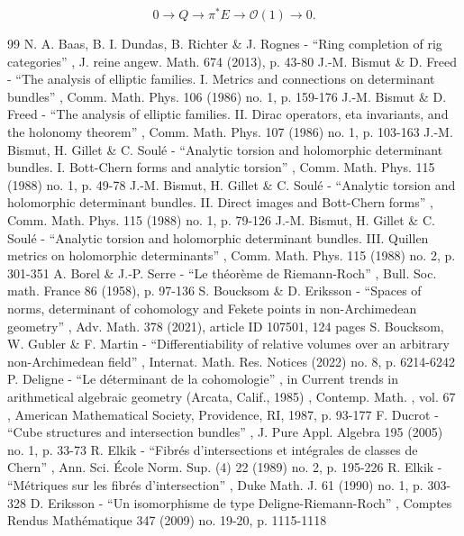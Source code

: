 \documentclass[11pt]{article}
\theoremstyle{plain}
\theoremstyle{definition}
\newcommand{\Ocal}{\mathcal O}
\begin{document}
\begin{equation}\label{eq:tautological-exact-sequence}
0 \to Q \to \pi^\ast E \to \Ocal(1) \to 0.
\end{equation}

\begin{thebibliography}{99}
 N. A. Baas, B. I. Dundas, B. Richter \& J. Rognes - “Ring completion of rig categories” , J. reine angew. Math. 674 (2013), p. 43-80
 J.-M. Bismut \& D. Freed - “The analysis of elliptic families. I. Metrics and connections on determinant bundles” , Comm. Math. Phys. 106 (1986) no. 1, p. 159-176
 J.-M. Bismut \& D. Freed - “The analysis of elliptic families. II. Dirac operators, eta invariants, and the holonomy theorem” , Comm. Math. Phys. 107 (1986) no. 1, p. 103-163
 J.-M. Bismut, H. Gillet \& C. Soulé - “Analytic torsion and holomorphic determinant bundles. I. Bott-Chern forms and analytic torsion” , Comm. Math. Phys. 115 (1988) no. 1, p. 49-78
 J.-M. Bismut, H. Gillet \& C. Soulé - “Analytic torsion and holomorphic determinant bundles. II. Direct images and Bott-Chern forms” , Comm. Math. Phys. 115 (1988) no. 1, p. 79-126
 J.-M. Bismut, H. Gillet \& C. Soulé - “Analytic torsion and holomorphic determinant bundles. III. Quillen metrics on holomorphic determinants” , Comm. Math. Phys. 115 (1988) no. 2, p. 301-351
 A. Borel \& J.-P. Serre - “Le théorème de Riemann-Roch” , Bull. Soc. math. France 86 (1958), p. 97-136
 S. Boucksom \& D. Eriksson - “Spaces of norms, determinant of cohomology and Fekete points in non-Archimedean geometry” , Adv. Math. 378 (2021), article ID 107501, 124 pages
 S. Boucksom, W. Gubler \& F. Martin - “Differentiability of relative volumes over an arbitrary non-Archimedean field” , Internat. Math. Res. Notices (2022) no. 8, p. 6214-6242
 P. Deligne - “Le déterminant de la cohomologie” , in Current trends in arithmetical algebraic geometry (Arcata, Calif., 1985) , Contemp. Math. , vol. 67 , American Mathematical Society, Providence, RI, 1987, p. 93-177
 F. Ducrot - “Cube structures and intersection bundles” , J. Pure Appl. Algebra 195 (2005) no. 1, p. 33-73
 R. Elkik - “Fibrés d’intersections et intégrales de classes de Chern” , Ann. Sci. École Norm. Sup. (4) 22 (1989) no. 2, p. 195-226
 R. Elkik - “Métriques sur les fibrés d’intersection” , Duke Math. J. 61 (1990) no. 1, p. 303-328
 D. Eriksson - “Un isomorphisme de type Deligne-Riemann-Roch” , Comptes Rendus Mathématique 347 (2009) no. 19-20, p. 1115-1118

\end{thebibliography}
\end{document}
